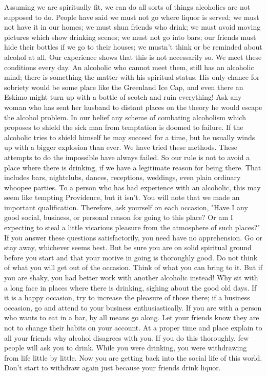 \begin{biblechapter}
Assuming we are spiritually fit, we can do all sorts of things alcoholics are not supposed to do.  People have said we must not go where liquor is served; we must not have it in our homes; we must shun friends who drink; we must avoid moving pictures which show drinking scenes; we must not go into bars; our friends must hide their bottles if we go to their houses; we mustn't think or be reminded about alcohol at all.  Our experience shows that this is not necessarily so.
We meet these conditions every day.  An alcoholic who cannot meet them, still has an alcoholic mind; there is something the matter with his spiritual status.  His only chance for sobriety would be some place like the Greenland Ice Cap, and even there an Eskimo might turn up with a bottle of scotch and ruin everything!  Ask any woman who has sent her husband to distant places on the theory he would escape the alcohol problem.
In our belief any scheme of combating alcoholism which proposes to shield the sick man from temptation is doomed to failure.  If the alcoholic tries to shield himself he may succeed for a time, but he usually winds up with a bigger explosion than ever.  We have tried these methods.  These attempts to do the impossible have always failed.
So our rule is not to avoid a place where there is drinking, if we have a legitimate reason for being there.  That includes bars, nightclubs, dances, receptions, weddings, even plain ordinary whoopee parties.  To a person who has had experience with an alcoholic, this may seem like tempting Providence, but it isn't.
You will note that we made an important qualification.  Therefore, ask yourself on each occasion, "Have I any good social, business, or personal reason for going to this place?  Or am I expecting to steal a little vicarious pleasure from the atmosphere of such places?"  If you answer these questions satisfactorily, you need have no apprehension.  Go or stay away, whichever seems best.  But be sure you are on solid spiritual ground before you start and that your motive in going is thoroughly good.  Do not think of what you will get out of the occasion.  Think of what you can bring to it.  But if you are shaky, you had better work with another alcoholic instead!
Why sit with a long face in places where there is drinking, sighing about the good old days.  If it is a happy occasion, try to increase the pleasure of those there; if a business occasion, go and attend to your business enthusiastically.  If you are with a person who wants to eat in a bar, by all means go along.  Let your friends know they are not to change their habits on your account.  At a proper time and place explain to all your friends why alcohol disagrees with you.  If you do this thoroughly, few people will ask you to drink.  While you were drinking, you were withdrawing from life little by little.  Now you are getting back into the social life of this world.  Don't start to withdraw again just because your friends drink liquor.

\end{biblechapter}
